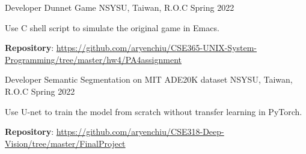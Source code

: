 
\begin{cventries}

  \cventry
    {Developer} %
    {Dunnet Game} %
    {NSYSU, Taiwan, R.O.C} %
    {Spring 2022} %
    {
      \begin{cvitems} %
        \item {Use C shell script to simulate the original game in Emacs.}
        \item {\textbf{Repository}: \href{https://github.com/aryenchiu/CSE365-UNIX-System-Programming/tree/master/hw4/PA4assignment}{https://github.com/aryenchiu/CSE365-UNIX-System-Programming/tree/master/hw4/PA4assignment}}
      \end{cvitems}
    }

    \cventry
    {Developer} %
    {Semantic Segmentation on MIT ADE20K dataset} %
    {NSYSU, Taiwan, R.O.C} %
    {Spring 2022} %
    {
      \begin{cvitems} %
        \item {Use U-net to train the model from scratch without transfer learning in PyTorch.}
        \item {\textbf{Repository}: \href{https://github.com/aryenchiu/CSE318-Deep-Vision/tree/master/FinalProject}{https://github.com/aryenchiu/CSE318-Deep-Vision/tree/master/FinalProject}}
      \end{cvitems}
    }

\end{cventries}
